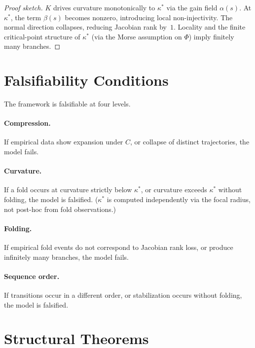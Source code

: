 \documentclass[12pt, oneside]{book}
\theoremstyle{plain}
\theoremstyle{definition}
\theoremstyle{remark}
\begin{document}
\begin{proof}[Proof sketch]
$K$ drives curvature monotonically to $\kappa^*$ via the gain field
$\alpha(s)$. At $\kappa^*$, the term $\beta(s)$ becomes nonzero,
introducing local non-injectivity. The normal direction collapses,
reducing Jacobian rank by~$1$. Locality and the finite critical-point
structure of $\kappa^*$ (via the Morse assumption on $\Phi$) imply
finitely many branches.
\end{proof}

\section{Falsifiability Conditions}

The framework is falsifiable at four levels.

\paragraph{Compression.}
If empirical data show expansion under $C$, or collapse of distinct
trajectories, the model fails.

\paragraph{Curvature.}
If a fold occurs at curvature strictly below $\kappa^*$, or curvature
exceeds $\kappa^*$ without folding, the model is falsified. ($\kappa^*$
is computed independently via the focal radius, not post-hoc from fold
observations.)

\paragraph{Folding.}
If empirical fold events do not correspond to Jacobian rank loss, or
produce infinitely many branches, the model fails.

\paragraph{Sequence order.}
If transitions occur in a different order, or stabilization occurs
without folding, the model is falsified.

\section{Structural Theorems}
\end{document}
